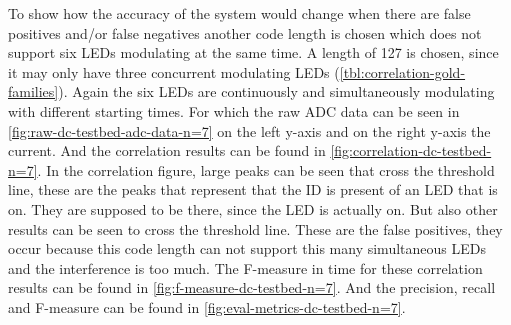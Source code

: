 To show how the accuracy of the system would change when there are false positives and/or false negatives another code length is chosen which does not support six LEDs modulating at the same time.
A length of 127 is chosen, since it may only have three concurrent modulating LEDs (\autoref{tbl:correlation-gold-families}).
Again the six LEDs are continuously and simultaneously modulating with different starting times.
For which the raw ADC data can be seen in \autoref{fig:raw-dc-testbed-adc-data-n=7} on the left y-axis and on the right y-axis the current.
And the correlation results can be found in \autoref{fig:correlation-dc-testbed-n=7}.
In the correlation figure, large peaks can be seen that cross the threshold line, these are the peaks that represent that the ID is present of an LED that is on.
They are supposed to be there, since the LED is actually on.
But also other results can be seen to cross the threshold line.
These are the false positives, they occur because this code length can not support this many simultaneous LEDs and the interference is too much.
The F-measure in time for these correlation results can be found in \autoref{fig:f-measure-dc-testbed-n=7}.
And the precision, recall and F-measure can be found in \autoref{fig:eval-metrics-dc-testbed-n=7}.





